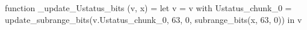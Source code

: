 function _update_Ustatus_bits (v, x) = let v = { v with Ustatus_chunk_0 = update_subrange_bits(v.Ustatus_chunk_0, 63, 0, subrange_bits(x, 63, 0)) } in
  v
